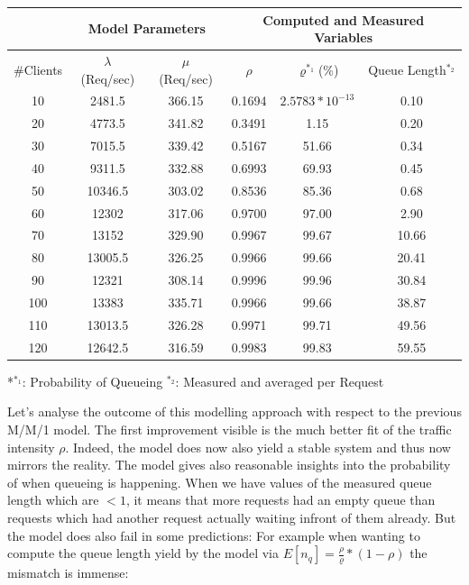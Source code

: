 \documentclass[11pt]{article}
\begin{document}
\begin{center}
	\begin{tabular}{c|c|c||c|c|c}
		\hline
		& \multicolumn{2}{c||}{Model Parameters} & \multicolumn{3}{c}{Computed and Measured Variables} \\
		\hline
		\#Clients & $\lambda$ (Req/sec) & $\mu$ (Req/sec) & $\rho$ & $\varrho^{*_1}$(\%) & Queue Length$^{*_2}$ \\
		\hline
		10 & 2481.5 & 366.15 & 0.1694 & $2.5783*10^{-13}$ & 0.10\\
		20 & 4773.5 & 341.82 & 0.3491 & 1.15 & 0.20\\
		30 & 7015.5 & 339.42 & 0.5167 & 51.66 & 0.34\\
		40 & 9311.5 & 332.88 & 0.6993 & 69.93 & 0.45\\
		50 & 10346.5 & 303.02 & 0.8536 &85.36 & 0.68\\
		60 & 12302 & 317.06 & 0.9700 & 97.00 & 2.90\\
		70 & 13152 & 329.90 & 0.9967 & 99.67 & 10.66\\
		80 & 13005.5 & 326.25 & 0.9966 & 99.66  & 20.41\\
		90 & 12321 & 308.14 & 0.9996 & 99.96 & 30.84\\
		100 & 13383 & 335.71 & 0.9966 & 99.66 & 38.87\\
		110 & 13013.5 & 326.28 & 0.9971 & 99.71 & 49.56\\
		120 & 12642.5 & 316.59 & 0.9983 & 99.83 & 59.55\\
		\hline		
	\end{tabular}
	*{$^{*_1}$: Probability of Queueing $^{*_2}$: Measured and averaged per Request}
\end{center}

Let's analyse the outcome of this modelling approach with respect to the previous M/M/1 model. The first improvement visible is the much better fit of the traffic intensity $\rho$. Indeed, the model does now also yield a stable system and thus now mirrors the reality. The model gives also reasonable insights into the probability of when queueing is happening. When we have values of the measured queue length which are $<1$, it means that more requests had an empty queue than requests which had another request actually waiting infront of them already. But the model does also fail in some predictions: For example when wanting to compute the queue length yield by the model via $E[n_q]=\frac{\rho}{\varrho}*(1-\rho)$ the mismatch is immense:
\end{document}
